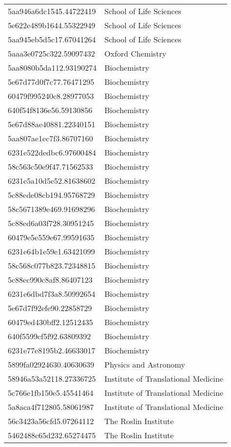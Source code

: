 \begin{tabular}{ll}
5aa946a6dc1545.44722419 & School of Life Sciences \\
5e622e489b1644.55322949 & School of Life Sciences \\
5aa945eb5d5c17.67041264 & School of Life Sciences \\
5aaa3e0725c322.59097432 & Oxford Chemistry \\
5aa8080b5da112.93190274 & Biochemistry \\
5e67d77d0f7c77.76471295 & Biochemistry \\
60479f995240c8.28977053 & Biochemistry \\
640f54f8136e56.59130856 & Biochemistry \\
5e67d88ae40881.22340151 & Biochemistry \\
5aa807ae1ec7f3.86707160 & Biochemistry \\
6231e522dedbc6.97600484 & Biochemistry \\
58c563c50e9f47.71562533 & Biochemistry \\
6231e5a10d5e52.81638602 & Biochemistry \\
5c88ede08cb194.95768729 & Biochemistry \\
58c5671389e469.91698296 & Biochemistry \\
5c88ed6a03f728.30951245 & Biochemistry \\
60479e5e559e67.99591635 & Biochemistry \\
6231e64b1e59e1.63421099 & Biochemistry \\
58c568c077b823.72348815 & Biochemistry \\
5c88ec990c8af8.86407123 & Biochemistry \\
6231e6dbd7f3a8.50992654 & Biochemistry \\
5e67d7f92efe90.22858729 & Biochemistry \\
60479ed430bff2.12512435 & Biochemistry \\
640f5599cf5f92.63809392 & Biochemistry \\
6231e77e8195b2.46633017 & Biochemistry \\
5899fa02924630.40630639 & Physics and Astronomy \\
58946a53a52118.27336725 & Institute of Translational Medicine \\
5c766e1fb150e5.45541464 & Institute of Translational Medicine \\
5a8aca4f712805.58061987 & Institute of Translational Medicine \\
56c3423a56cfd5.07264112 & The Roslin Institute \\
5462488c65d232.65274475 & The Roslin Institute \\

\end{tabular}
